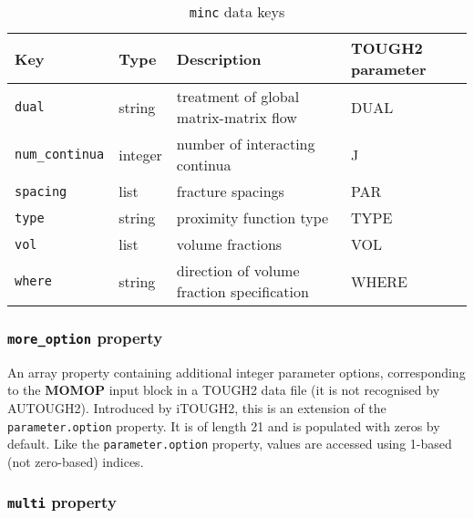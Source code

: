 \begin{table}
  \begin{center}
    \begin{tabular}{|l|l|l|l|}
      \hline
      \textbf{Key} & \textbf{Type} & \textbf{Description} & \textbf{TOUGH2 parameter}\\
      \hline
      \texttt{dual} & string & treatment of global matrix-matrix flow & DUAL\\
      \texttt{num\_continua} & integer & number of interacting continua & J\\
      \texttt{spacing} & list & fracture spacings & PAR\\
      \texttt{type} & string & proximity function type & TYPE\\
      \texttt{vol} & list & volume fractions & VOL\\
      \texttt{where} & string & direction of volume fraction specification & WHERE\\
      \hline
    \end{tabular}
    \caption{\texttt{minc} data keys}
    \label{tb:minc}
  \end{center}
\end{table}

\begin{snugshade}
\subsubsection{\texttt{more\_option} property}
\end{snugshade}
\label{sec:t2data:more_options}

An array property containing additional integer parameter options, corresponding to the \textbf{MOMOP} input block in a TOUGH2 data file (it is not recognised by AUTOUGH2). Introduced by iTOUGH2, this is an extension of the \texttt{parameter.option} property. It is of length 21 and is populated with zeros by default. Like the \texttt{parameter.option} property, values are accessed using 1-based (not zero-based) indices.

\begin{snugshade}
\subsubsection{\texttt{multi} property}
\end{snugshade}
\label{sec:t2data:multi}

